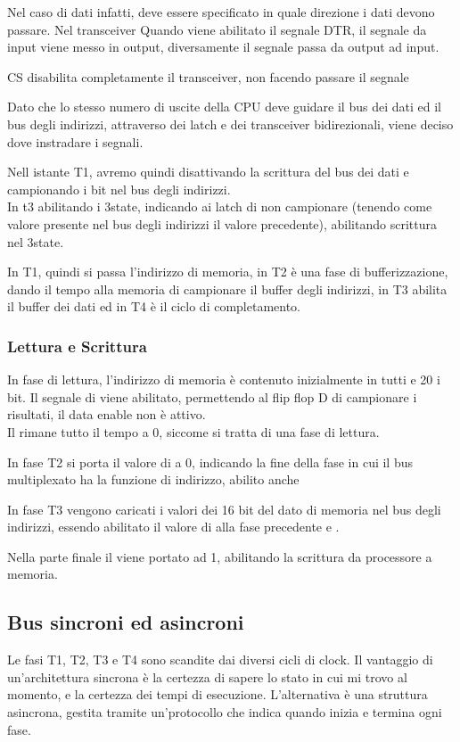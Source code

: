 \documentclass[../template]{subfiles}
\begin{document}
Nel caso di dati infatti, deve essere specificato in quale direzione i dati devono passare.
Nel transceiver Quando viene abilitato il segnale DTR, il segnale da input viene messo in output, diversamente il segnale passa da output ad input.

CS disabilita completamente il transceiver, non facendo passare il segnale

Dato che lo stesso numero di uscite della CPU deve guidare il bus dei dati ed il bus degli indirizzi, attraverso dei latch e dei transceiver bidirezionali, viene deciso dove instradare i segnali.

Nell istante T1, avremo quindi  disattivando la scrittura del bus dei dati e  campionando i bit nel bus degli indirizzi.
\\
In t3  abilitando i 3state,  indicando ai latch di non campionare (tenendo come valore presente nel bus degli indirizzi il valore precedente),  abilitando scrittura nel 3state.

In T1, quindi si passa l'indirizzo di memoria, in T2 è una fase di bufferizzazione, dando il tempo alla memoria di campionare il buffer degli indirizzi, in T3 abilita il buffer dei dati ed in T4 è il ciclo di completamento.

\subsubsection{Lettura e Scrittura}
In fase di lettura, l'indirizzo di memoria è contenuto inizialmente in tutti e 20 i bit. Il segnale di  viene abilitato, permettendo al flip flop D di campionare i risultati, il data enable non è attivo.
\\
Il  rimane tutto il tempo a 0, siccome si tratta di una fase di lettura.

In fase T2 si porta il valore di  a 0, indicando la fine della fase in cui il bus multiplexato ha la funzione di indirizzo, abilito anche 

In fase T3 vengono caricati i valori dei 16 bit del dato di memoria nel bus degli indirizzi, essendo abilitato il valore di  alla fase precedente e .

Nella parte finale il  viene portato ad 1, abilitando la scrittura da processore a memoria.
\newpage
\subsection{Bus sincroni ed asincroni}
Le fasi T1, T2, T3 e T4 sono scandite dai diversi cicli di clock.
Il vantaggio di un'architettura sincrona è la certezza di sapere lo stato in cui mi trovo al momento, e la certezza dei tempi di esecuzione. L'alternativa è una struttura asincrona, gestita tramite un'protocollo che indica quando inizia e termina ogni fase.
\end{document}
